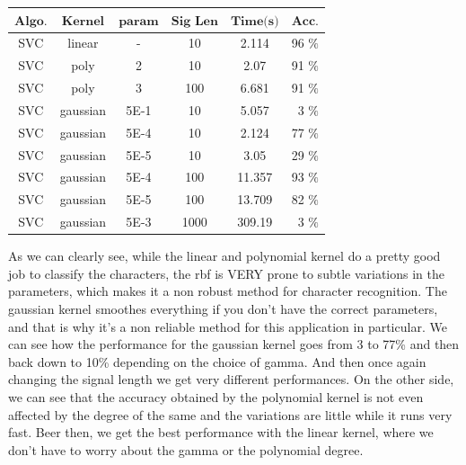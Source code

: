 \documentclass{article}
\begin{document}
\begin{center}
    \begin{tabular}{ | c | c | c | c | c | r |}
    \hline
    $\textbf{Algo.}$ & $\textbf{Kernel}$  & $\textbf{param}$ & $\textbf{Sig Len}$ & $\textbf{Time(s)}$ & $\textbf{Acc.}$ \\ \hline
    SVC & linear & - & 10 & 2.114 & 96 $\%$ \\ \hline
    SVC & poly & 2 & 10 & 2.07 & 91 $\%$ \\ \hline
    SVC & poly & 3 & 100 & 6.681 & 91 $\%$ \\ \hline
    SVC & gaussian & 5E-1 & 10 & 5.057 & 3 $\%$ \\ \hline
    SVC & gaussian & 5E-4 & 10 & 2.124 & 77 $\%$ \\ \hline
    SVC & gaussian & 5E-5 & 10 & 3.05 & 29 $\%$ \\ \hline
    SVC & gaussian & 5E-4 & 100 & 11.357 & 93 $\%$ \\ \hline
    SVC & gaussian & 5E-5 & 100 & 13.709 & 82 $\%$ \\ \hline
    SVC & gaussian & 5E-3 & 1000 & 309.19 & 3 $\%$ \\ \hline
    
    \end{tabular}
\end{center}

As we can clearly see, while the linear and polynomial kernel do a pretty good job to classify the characters, the rbf is VERY prone to subtle variations in the parameters, which makes it a non robust method for character recognition. The gaussian kernel smoothes everything if you don't have the correct parameters, and that is why it's a non reliable method for this application in particular. We can see how the performance for the gaussian kernel goes from 3 to 77\% and then back down to 10\% depending on the choice of gamma. And then once again changing the signal length we get very different performances.
On the other side, we can see that the accuracy obtained by the polynomial kernel is not even affected by the degree of the same and the variations are little while it runs very fast. Beer then, we get the best performance with the linear kernel, where we don't have to worry about the gamma or the polynomial degree.
\end{document}
